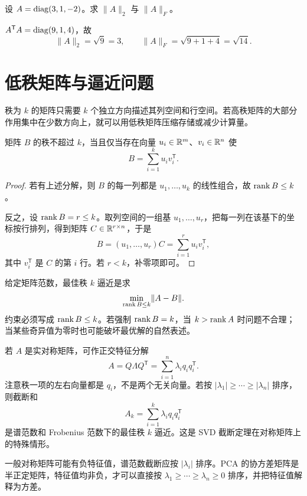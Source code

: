 \begin{example}[title={计算两种矩阵范数}]
设 $A=\operatorname{diag}(3,1,-2)$。求 $\lVert A\rVert_2$ 与 $\lVert A\rVert_F$。
\begin{solution}
$A^{\mathsf T}A=\operatorname{diag}(9,1,4)$，故
\[
\lVert A\rVert_2=\sqrt9=3,
\qquad
\lVert A\rVert_F=\sqrt{9+1+4}=\sqrt{14}.
\]
\end{solution}
\end{example}

\section{低秩矩阵与逼近问题}

秩为 $k$ 的矩阵只需要 $k$ 个独立方向描述其列空间和行空间。若高秩矩阵的大部分作用集中在少数方向上，就可以用低秩矩阵压缩存储或减少计算量。

\begin{proposition}[秩一分解]
矩阵 $B$ 的秩不超过 $k$，当且仅当存在向量 $u_i\in\mathbb{R}^m$、$v_i\in\mathbb{R}^n$ 使
\[
B=\sum_{i=1}^ku_iv_i^{\mathsf T}.
\]
\end{proposition}
\begin{proof}
若有上述分解，则 $B$ 的每一列都是 $u_1,\ldots,u_k$ 的线性组合，故 $\operatorname{rank} B\le k$。

反之，设 $\operatorname{rank} B=r\le k$。取列空间的一组基 $u_1,\ldots,u_r$，把每一列在该基下的坐标按行排列，得到矩阵 $C\in\mathbb{R}^{r\times n}$，于是
\[
B=(u_1,\ldots,u_r)C=\sum_{i=1}^ru_iv_i^{\mathsf T},
\]
其中 $v_i^{\mathsf T}$ 是 $C$ 的第 $i$ 行。若 $r<k$，补零项即可。
\end{proof}

\begin{definition}
给定矩阵范数，最佳秩 $k$ 逼近是求
\[
\min_{\operatorname{rank} B\le k}\lVert A-B\rVert.
\]
约束必须写成 $\operatorname{rank} B\le k$。若强制 $\operatorname{rank} B=k$，当 $k>\operatorname{rank} A$ 时问题不合理；当某些奇异值为零时也可能破坏最优解的自然表述。
\end{definition}

若 $A$ 是实对称矩阵，可作正交特征分解
\[
A=Q\Lambda Q^{\mathsf T}=\sum_{i=1}^n\lambda_iq_iq_i^{\mathsf T}.
\]
注意秩一项的左右向量都是 $q_i$，不是两个无关向量。若按 $|\lambda_1|\ge\cdots\ge|\lambda_n|$ 排序，则截断和
\[
A_k=\sum_{i=1}^k\lambda_iq_iq_i^{\mathsf T}
\]
是谱范数和 Frobenius 范数下的最佳秩 $k$ 逼近。这是 SVD 截断定理在对称矩阵上的特殊情形。

\begin{pitfall}
一般对称矩阵可能有负特征值，谱范数截断应按 $|\lambda_i|$ 排序。PCA 的协方差矩阵是半正定矩阵，特征值均非负，才可以直接按 $\lambda_1\ge\cdots\ge\lambda_n\ge0$ 排序，并把特征值解释为方差。
\end{pitfall}

